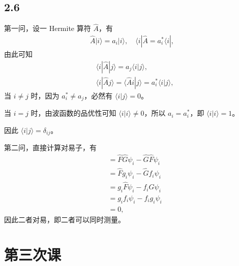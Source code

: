 \subsection{2.6}
第一问，设一 Hermite 算符 $\hat A$，有
\begin{align}
    \hat A |i\rangle = a_i |i\rangle, \quad \langle i | \hat A = a_i^* \langle i|,
\end{align}
由此可知
\begin{align}
    & \langle i |\hat A | j \rangle = a_j \langle i | j\rangle, \\
    & \langle i |\hat A j \rangle = \langle\hat A i | j \rangle = a^*_i  \langle i | j\rangle,
\end{align}
当 $i\neq j$ 时，因为 $a^*_i \neq a_j$，必然有 $\langle i | j\rangle = 0$。

当 $i = j$ 时，由波函数的品优性可知 $\langle i | i\rangle \neq 0$，所以 $a_i = a_i^*$，即 $\langle i | i\rangle = 1$。

因此 $\langle i | j \rangle = \delta_{ij}$。

第二问，直接计算对易子，有
\begin{align}
    [\hat F, \hat G] &= \hat F\hat G \psi_i - \hat G\hat F \psi_i \\
    &= \hat F g_i \psi_i - \hat G f_i \psi_i \\
    &= g_i \hat F \psi_i - f_i \hat G \psi_i \\
    &= g_i f_i \psi_i - f_i g_i \psi_i \\
    &= 0,
\end{align}
因此二者对易，即二者可以同时测量。


\section{第三次课}
